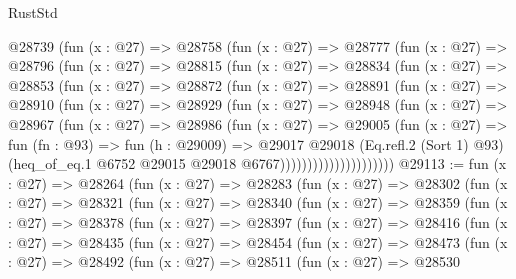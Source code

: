 \begin{lexlean}{RustStd}
\begin{coremodule}
            @28739
              (fun (x : @27) =>
              @28758
                (fun (x : @27) =>
                @28777
                  (fun (x : @27) =>
                  @28796
                    (fun (x : @27) =>
                    @28815
                      (fun (x : @27) =>
                      @28834
                        (fun (x : @27) =>
                        @28853
                          (fun (x : @27) =>
                          @28872
                            (fun (x : @27) =>
                            @28891
                              (fun (x : @27) =>
                              @28910
                                (fun (x : @27) =>
                                @28929
                                  (fun (x : @27) =>
                                  @28948
                                    (fun (x : @27) =>
                                    @28967
                                      (fun (x : @27) =>
                                      @28986
                                        (fun (x : @27) =>
                                        @29005
                                          (fun (x : @27) =>
                                          fun (fn : @93) =>
                                          fun (h : @29009) =>
                                          @29017
                                            @29018
                                            (Eq.refl.{2} (Sort 1) @93)
                                            (heq_of_eq.{1}
                                              @6752
                                              @29015
                                              @29018
                                              @6767)))))))))))))))))))))
@29113 := fun (x : @27) =>
  @28264
    (fun (x : @27) =>
    @28283
      (fun (x : @27) =>
      @28302
        (fun (x : @27) =>
        @28321
          (fun (x : @27) =>
          @28340
            (fun (x : @27) =>
            @28359
              (fun (x : @27) =>
              @28378
                (fun (x : @27) =>
                @28397
                  (fun (x : @27) =>
                  @28416
                    (fun (x : @27) =>
                    @28435
                      (fun (x : @27) =>
                      @28454
                        (fun (x : @27) =>
                        @28473
                          (fun (x : @27) =>
                          @28492
                            (fun (x : @27) =>
                            @28511
                              (fun (x : @27) =>
                              @28530

\end{coremodule}
\end{lexlean}
